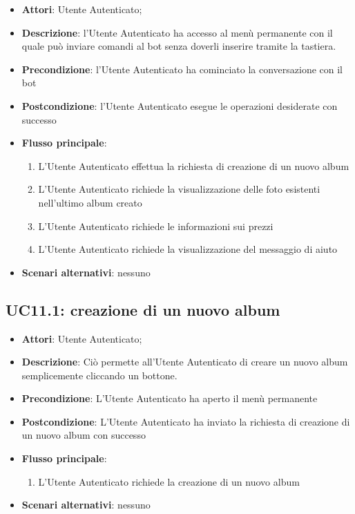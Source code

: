 \begin{itemize}
  \item \textbf{Attori}: Utente Autenticato;
  \item \textbf{Descrizione}: l'Utente Autenticato ha accesso al menù
permanente con il quale può inviare comandi al bot senza doverli inserire
tramite la tastiera.
  \item \textbf{Precondizione}: l'Utente Autenticato ha cominciato la
conversazione con il bot
  \item \textbf{Postcondizione}: l'Utente Autenticato esegue le operazioni
desiderate con successo
  \item \textbf{Flusso principale}:
  \begin{enumerate}
    \item L'Utente Autenticato effettua la richiesta di creazione di un nuovo
album
    \item L'Utente Autenticato richiede la visualizzazione delle foto esistenti
nell'ultimo album creato
    \item L'Utente Autenticato richiede le informazioni sui prezzi
    \item L'Utente Autenticato richiede la visualizzazione del messaggio di
aiuto
  \end{enumerate}
  \item \textbf{Scenari alternativi}: nessuno
\end{itemize}



\subsection{UC11.1: creazione di un nuovo album}
\label{uc:uc11.1}

\begin{itemize}
  \item \textbf{Attori}: Utente Autenticato;
  \item \textbf{Descrizione}: Ciò permette all'Utente Autenticato di creare un
nuovo album semplicemente cliccando un bottone.
  \item \textbf{Precondizione}: L'Utente Autenticato ha aperto il menù
permanente
  \item \textbf{Postcondizione}: L'Utente Autenticato ha inviato la richiesta
di creazione di un nuovo album con successo
  \item \textbf{Flusso principale}:
  \begin{enumerate}
    \item L'Utente Autenticato richiede la creazione di un nuovo album
  \end{enumerate}
  \item \textbf{Scenari alternativi}: nessuno
\end{itemize}


